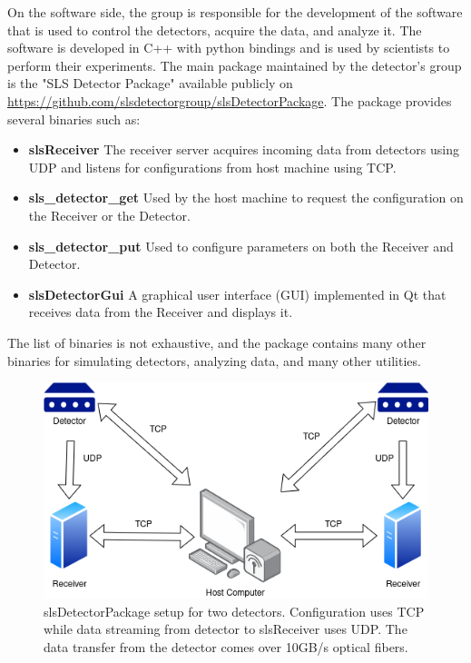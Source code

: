 \begin{spacing}{1.2}
    On the software side, the group is responsible for the development of the software that is used to control the detectors, acquire the data, and analyze it.
    The software is developed in C++ with python bindings and is used by scientists to perform their experiments.
    The main package maintained by the detector's group is the "SLS Detector Package" available publicly
    on \url{https://github.com/slsdetectorgroup/slsDetectorPackage}. The package provides several binaries such as:
    \begin{itemize}
        \item \textbf{slsReceiver} The receiver server acquires incoming data from detectors using UDP and listens for configurations from host machine using TCP.
        \item \textbf{sls\_detector\_get} Used by the host machine to request the configuration on the Receiver or the Detector.
        \item \textbf{sls\_detector\_put} Used to configure parameters on both the Receiver and Detector.
        \item \textbf{slsDetectorGui} A graphical user interface (GUI) implemented in Qt that receives data from the Receiver and displays it.
    \end{itemize}
    The list of binaries is not exhaustive, and the package contains many other binaries for simulating detectors, analyzing data, and many other utilities.

    \begin{figure}[h]
        \centering
        \includegraphics[scale=0.8]{Chapitre1/figures/slsreceiver.png}
        \caption{slsDetectorPackage setup for two detectors. Configuration uses TCP while
            data streaming from detector to slsReceiver uses UDP. The data transfer from the detector
            comes over 10GB/s optical fibers.}
        \label{fig:detector}
    \end{figure}


\end{spacing}
